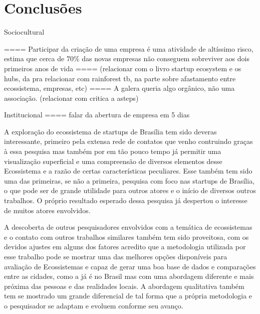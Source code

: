 \chapter[Conclusões Pré-Eliminares]{Conclusões}
\label{cap-conclusoes}

Sociocultural

==== Participar da criação de uma empresa é uma atividade de altíssimo risco,  estima que cerca de 70\% das novas empresas não conseguem sobreviver aos dois primeiros anos de vida
==== (relacionar com o livro startup ecosystem e os hubs, da pra relacionar com rainforest tb, na parte sobre afastamento entre ecossistema, empresas, etc)
==== A galera queria algo orgânico, não uma associação. (relacionar com critica a asteps)

Institucional
==== falar da abertura de empresa em 5 dias


A exploração do ecossistema de startups de Brasília tem sido deveras interessante, primeiro pela extensa rede de contatos que venho contruindo graças à essa pesquisa mas também por em tão pouco tempo já permitir uma visualização superficial e uma compreensão de diversos elementos desse Ecossistema e a razão de certas características peculiares. Esse também tem sido uma das primeiras, se não a primeira, pesquisa com foco nas startups de Brasília, o que pode ser de grande utilidade para outros atores e o início de diversos outros trabalhos. O próprio resultado esperado dessa pesquisa já despertou o interesse de muitos atores envolvidos.

A descoberta de outros pesquisadores envolvidos com a temática de ecossistemas e o contato com outros trabalhos similares também tem sido proveitosa, com os devidos ajustes em alguns dos fatores acredito que a metodologia utilizada por esse trabalho pode se mostrar uma das melhores opções disponíveis para avaliação de Ecossistemas e capaz de gerar uma boa base de dados e comparações entre as cidades, como a  já é no Brasil mas com uma abordagem diferente e mais próxima das pessoas e das realidades locais. A abordagem qualitativa também tem se mostrado um grande diferencial de tal forma que a própria metodologia e o pesquisador se adaptam e evoluem conforme seu avanço.
